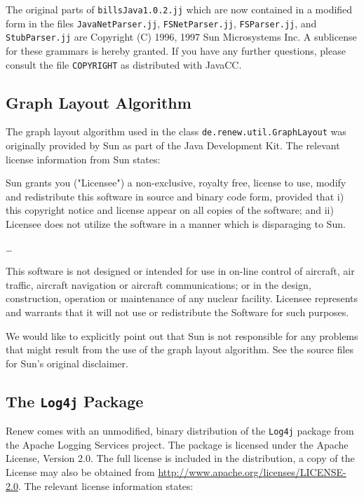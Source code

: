 The original parts of \texttt{billsJava1.0.2.jj} which are now contained 
in a modified form in the files \texttt{JavaNetParser.jj}, \texttt{FSNetParser.jj}, 
\texttt{FSParser.jj}, and \texttt{StubParser.jj} are Copyright (C) 1996, 1997
Sun Microsystems Inc. A sublicense for these grammars is hereby granted. 
If you have any further questions, please consult the file \texttt{COPYRIGHT} 
as distributed with JavaCC.


\subsection{Graph Layout Algorithm}

The graph layout algorithm used in the class \texttt{de.renew.util.GraphLayout}
was originally provided by Sun as part of the Java Development Kit.
The relevant license information from Sun states:
\begin{licensequote}
Sun grants you ("Licensee") a non-exclusive, royalty free, license to use,
modify and redistribute this software in source and binary code form,
provided that i) this copyright notice and license appear on all copies of
the software; and ii) Licensee does not utilize the software in a manner
which is disparaging to Sun.

\dots

This software is not designed or intended for use in on-line control 
of aircraft, air traffic, aircraft navigation or aircraft communications; 
or in the design, construction, operation or maintenance of any nuclear
facility. Licensee represents and warrants that it will not use or
redistribute the Software for such purposes.
\end{licensequote}

We would like to explicitly point out that Sun is not responsible
for any problems that might result from the use of the graph layout 
algorithm. See the source files for Sun's original disclaimer.


\subsection{The \texttt{Log4j} Package}

Renew comes with an unmodified, binary distribution of the \texttt{Log4j}
package from the Apache Logging Services project.
The package is licensed under the Apache License, Version 2.0. 
The full license is included in the distribution, a copy of the License may
also be obtained from \url{http://www.apache.org/licenses/LICENSE-2.0}.
The relevant license information states:


